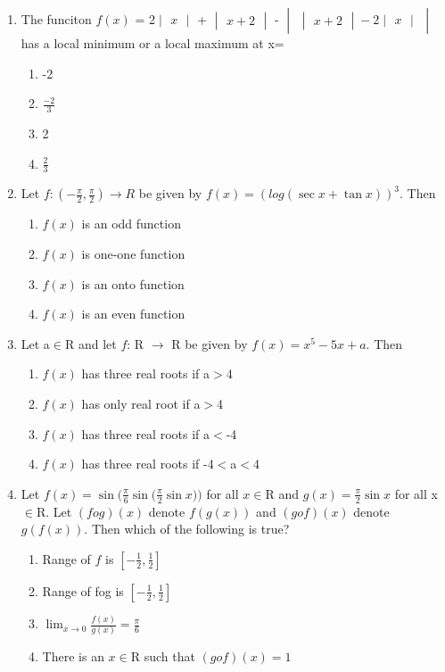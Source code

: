 \begin{enumerate}[label=\arabic*.,ref=\thesubsection.\theenumi]
\item The funciton 
$f(x)$ = 2$\begin{vmatrix} x \end{vmatrix}$
 + $\begin{vmatrix} x+2 \end{vmatrix}$
 - $\begin{vmatrix}\begin{vmatrix} x+2 \end{vmatrix} 
 - 2\begin{vmatrix} x \end{vmatrix}\end{vmatrix}$ has a local minimum or a local maximum at x=
\begin{enumerate}
\item -2
\item $\frac{-2}{3}$
\item 2
\item $\frac{2}{3}$
\end{enumerate}

\item Let $f: (-\frac{\pi}{2},\frac{\pi}{2})\rightarrow R$ be given by $f(x)=(log(\sec x+\tan x))^3$. Then
\begin{enumerate}
\item $f(x)$ is an odd function 
\item $f(x)$ is one-one function
\item $f(x)$ is an onto function
\item $f(x)$ is an even function
\end{enumerate}

\item Let a$\in$R and let $f$: R $\rightarrow$ R be given by $f(x)=x^5-5x+a$. Then
\begin{enumerate}
\item $f(x)$ has three real roots if a$>$4
\item $f(x)$ has only real root if a$>$4
\item $f(x)$ has three real roots if a$<$-4
\item $f(x)$ has three real roots if -4$<$a$<$4
\end{enumerate}

\item Let $f(x)=\sin\Big(\frac{\pi}{6}\sin\Big(\frac{\pi}{2}\sin x\Big)\Big)$ for all $x\in$R and $g(x)=\frac{\pi}{2}\sin x$ for all x$\in$R. Let $(fog)(x)$ denote $f(g(x))$ and $(gof)(x)$ denote $g(f(x)).$ Then which of the following is true?
\begin{enumerate}
\item Range of $f$ is $[-\frac{1}{2},\frac{1}{2}]$
\item Range of fog is $[-\frac{1}{2},\frac{1}{2}]$
\item $\lim_{x \to 0}\frac{f(x)}{g(x)}=\frac{\pi}{6}$
\item There is an $x\in$R such that $(gof)(x)=1$
\end{enumerate}


\end{enumerate}
